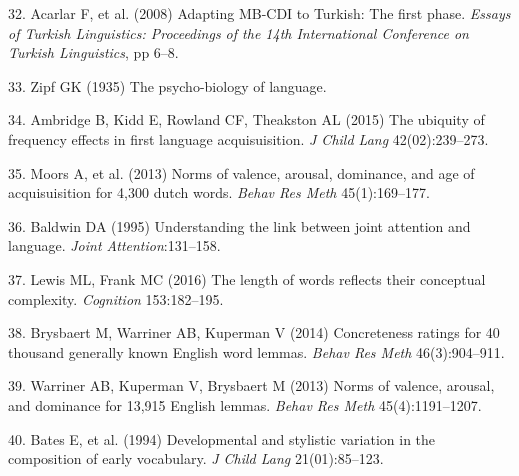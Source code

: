 \documentclass[english,man]{apa6}
\theoremstyle{definition}
\theoremstyle{definition}
\theoremstyle{definition}
\theoremstyle{remark}
\begin{document}
\hypertarget{ref-acarlar2008}{}
32. Acarlar F, et al. (2008) Adapting MB-CDI to Turkish: The first
phase. \emph{Essays of Turkish Linguistics: Proceedings of the 14th
International Conference on Turkish Linguistics}, pp 6--8.

\hypertarget{ref-zipf1935}{}
33. Zipf GK (1935) The psycho-biology of language.

\hypertarget{ref-ambridge2015}{}
34. Ambridge B, Kidd E, Rowland CF, Theakston AL (2015) The ubiquity of
frequency effects in first language acquisuisition. \emph{J Child Lang}
42(02):239--273.

\hypertarget{ref-moors2013}{}
35. Moors A, et al. (2013) Norms of valence, arousal, dominance, and age
of acquisuisition for 4,300 dutch words. \emph{Behav Res Meth}
45(1):169--177.

\hypertarget{ref-baldwin1995}{}
36. Baldwin DA (1995) Understanding the link between joint attention and
language. \emph{Joint Attention}:131--158.

\hypertarget{ref-lewis2016}{}
37. Lewis ML, Frank MC (2016) The length of words reflects their
conceptual complexity. \emph{Cognition} 153:182--195.

\hypertarget{ref-brysbaert2014}{}
38. Brysbaert M, Warriner AB, Kuperman V (2014) Concreteness ratings for
40 thousand generally known English word lemmas. \emph{Behav Res Meth}
46(3):904--911.

\hypertarget{ref-warriner2013}{}
39. Warriner AB, Kuperman V, Brysbaert M (2013) Norms of valence,
arousal, and dominance for 13,915 English lemmas. \emph{Behav Res Meth}
45(4):1191--1207.

\hypertarget{ref-bates1994}{}
40. Bates E, et al. (1994) Developmental and stylistic variation in the
composition of early vocabulary. \emph{J Child Lang} 21(01):85--123.
\end{document}
